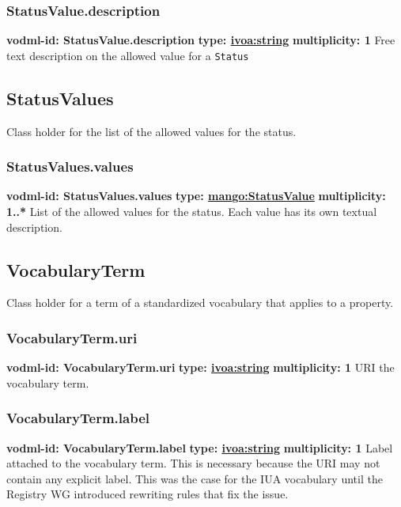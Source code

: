     \subsubsection{StatusValue.description}
      \textbf{vodml-id: StatusValue.description} \newline
      \textbf{type: \hyperref[sect:ivoa]{ivoa:string}} \newline
      \textbf{multiplicity: 1} \newline 
      Free text description on the allowed value for a \texttt{Status}

  \subsection{StatusValues}
  \label{sect:StatusValues}
    Class holder for the list of the allowed values for the status.

    \subsubsection{StatusValues.values}
      \textbf{vodml-id: StatusValues.values} \newline
      \textbf{type: \hyperref[sect:StatusValue]{mango:StatusValue}} \newline
      \textbf{multiplicity: 1..*} \newline 
      List of the allowed values for the status. Each value has its own textual description.

  \subsection{VocabularyTerm}
  \label{sect:VocabularyTerm}
    Class holder for a term of a standardized vocabulary that applies to a property.

    \subsubsection{VocabularyTerm.uri}
      \textbf{vodml-id: VocabularyTerm.uri} \newline
      \textbf{type: \hyperref[sect:ivoa]{ivoa:string}} \newline
      \textbf{multiplicity: 1} \newline 
      URI the vocabulary term.

    \subsubsection{VocabularyTerm.label}
      \textbf{vodml-id: VocabularyTerm.label} \newline
      \textbf{type: \hyperref[sect:ivoa]{ivoa:string}} \newline
      \textbf{multiplicity: 1} \newline 
      Label attached to the vocabulary term. This is necessary because the URI may not contain any explicit label. This was the case for the IUA vocabulary until the Registry WG introduced rewriting rules that fix the issue.

